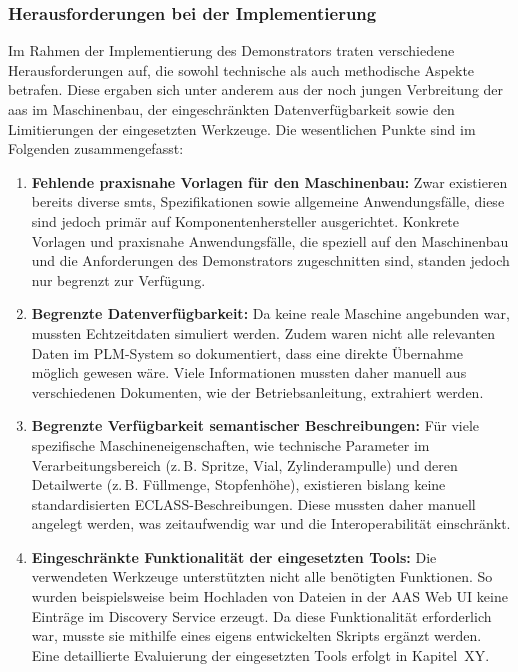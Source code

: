 \newpage
\subsubsection{Herausforderungen bei der Implementierung}
Im Rahmen der Implementierung des Demonstrators traten verschiedene Herausforderungen auf, die sowohl technische als auch methodische Aspekte betrafen. 
Diese ergaben sich unter anderem aus der noch jungen Verbreitung der \acs{aas} im Maschinenbau, der eingeschränkten Datenverfügbarkeit sowie den Limitierungen der eingesetzten Werkzeuge. 
Die wesentlichen Punkte sind im Folgenden zusammengefasst:

\begin{enumerate}
    \item \textbf{Fehlende praxisnahe Vorlagen für den Maschinenbau:}  
    Zwar existieren bereits diverse \acsp{smt}, Spezifikationen sowie allgemeine Anwendungsfälle, diese sind jedoch primär auf Komponentenhersteller ausgerichtet.  
    Konkrete Vorlagen und praxisnahe Anwendungsfälle, die speziell auf den Maschinenbau und die Anforderungen des Demonstrators zugeschnitten sind, standen jedoch nur begrenzt zur Verfügung.

    \item \textbf{Begrenzte Datenverfügbarkeit:}  
    Da keine reale Maschine angebunden war, mussten Echtzeitdaten simuliert werden.  
    Zudem waren nicht alle relevanten Daten im PLM-System so dokumentiert, dass eine direkte Übernahme möglich gewesen wäre.  
    Viele Informationen mussten daher manuell aus verschiedenen Dokumenten, wie der Betriebsanleitung, extrahiert werden.  

    \item \textbf{Begrenzte Verfügbarkeit semantischer Beschreibungen:}  
    Für viele spezifische Maschineneigenschaften, wie technische Parameter im Verarbeitungsbereich (z.\,B. Spritze, Vial, Zylinderampulle) und deren Detailwerte (z.\,B. Füllmenge, Stopfenhöhe), existieren bislang keine standardisierten ECLASS-Beschreibungen.  
    Diese mussten daher manuell angelegt werden, was zeitaufwendig war und die Interoperabilität einschränkt.

    \item \textbf{Eingeschränkte Funktionalität der eingesetzten Tools:}  
    Die verwendeten Werkzeuge unterstützten nicht alle benötigten Funktionen.  
    So wurden beispielsweise beim Hochladen von Dateien in der AAS Web UI keine Einträge im Discovery Service erzeugt.  
    Da diese Funktionalität erforderlich war, musste sie mithilfe eines eigens entwickelten Skripts ergänzt werden.  
    Eine detaillierte Evaluierung der eingesetzten Tools erfolgt in Kapitel~XY.


\end{enumerate}
